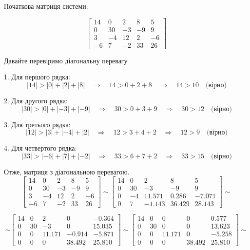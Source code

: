 \documentclass[a4paper, 12pt]{article}
\begin{document}
Початкова матриця системи:

\[
\left[
\begin{array}{cccc|c}
14 & 0 & 2 & 8 & 5 \\
0 & 30 & -3 & -9 & 9 \\
3 & -4 & 12 & 2 & -6 \\
-6 & 7 & -2 & 33 & 26
\end{array}
\right] 
\]

Давайте перевіримо діагональну перевагу 

1. Для першого рядка:
   \[
   |14| > |0| + |2| + |8| \quad \Rightarrow \quad 14 > 0 + 2 + 8 \quad \Rightarrow \quad 14 > 10 \quad \text{(вірно)}
   \]

2. Для другого рядка:
   \[
   |30| > |0| + |-3| + |-9| \quad \Rightarrow \quad 30 > 0 + 3 + 9 \quad \Rightarrow \quad 30 > 12 \quad \text{(вірно)}
   \]

3. Для третього рядка:
   \[
   |12| > |3| + |-4| + |2| \quad \Rightarrow \quad 12 > 3 + 4 + 2 \quad \Rightarrow \quad 12 > 9 \quad \text{(вірно)}
   \]

4. Для четвертого рядка:
   \[
   |33| > |-6| + |7| + |-2| \quad \Rightarrow \quad 33 > 6 + 7 + 2 \quad \Rightarrow \quad 33 > 15 \quad \text{(вірно)}
   \]

Отже, матриця з діагональною перевагою. \\
\[
\left[
\begin{array}{cccc|c}
14 & 0 & 2 & 8 & 5 \\
0 & 30 & -3 & -9 & 9 \\
3 & -4 & 12 & 2 & -6 \\
-6 & 7 & -2 & 33 & 26
\end{array}
\right] 
\sim
\left[
\begin{array}{cccc|c}
14 & 0 & 2 & 8 & 5 \\
0 & 30 & -3 & -9 & 9 \\
0 & -4 & 11.571 & 0.286 & -7.071 \\
0 & 7 & -1.143 & 36.429 & 28.143
\end{array}
\right] 
\sim
\]

\[
\sim
\left[
\begin{array}{cccc|c}
14 & 0 & 2 & 0 & -0.364 \\
0 & 30 & -3 & 0 & 15.035 \\
0 & 0 & 11.171 & -0.914 & -5.871 \\
0 & 0 & 0 & 38.492 & 25.810
\end{array}
\right] 
\sim 
\left[
\begin{array}{cccc|c}
14 & 0 & 0 & 0 & 0.577 \\
0 & 30 & 0 & 0 & 13.623 \\
0 & 0 & 11.171 & 0 & -5.258 \\
0 & 0 & 0 & 38.492 & 25.810
\end{array}
\right] 
\sim
\]
\end{document}
